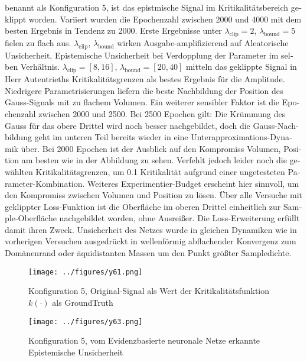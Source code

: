 \begin{otherlanguage}{ngerman}
benannt als Konfiguration 5, ist das epistmische Signal im Kritikalitätsbereich geklippt worden. Variiert wurden die Epochenzahl zwischen 2000 und 4000 mit dem besten Ergebnis in Tendenz zu 2000. Erste Ergebnisse unter $\lambda_{\text{clip}}=2$, $\lambda_{\text{bound}}=5$ fielen zu flach aus. $\lambda_{\text{clip}}$, $\lambda_{\text{bound}}$ wirken Ausgabe-amplifizierend auf \gls{Aleatorische Unsicherheit}, \gls{Epistemische Unsicherheit} bei Verdopplung der Parameter im selben Verhältnis. $\lambda_{\text{clip}}=[8, 16]$, $\lambda_{\text{bound}}=[20, 40]$ mitteln das geklippte Signal in Herr Autentrieths Kritikalitätsgrenzen als bestes Ergebnis für die Amplitude. Niedrigere Parametrisierungen liefern die beste Nachbildung der Position des Gauss-Signals mit zu flachem Volumen. Ein weiterer sensibler Faktor ist die Epochenzahl zwischen 2000 und 2500. Bei 2500 Epochen gilt: Die Krümmung des Gauss für das obere Drittel wird noch besser nachgebildet, doch die Gauss-Nachbildung geht im unteren Teil bereits wieder in eine Unterapproximations-Dynamik über. Bei 2000 Epochen ist der Ausblick auf den Kompromiss Volumen, Position am besten wie in der Abbildung zu sehen. Verfehlt jedoch leider noch die gewählten Kritikalitätsgrenzen, um 0.1 Kritikalität aufgrund einer ungetesteten Parameter-Kombination. Weiteres Experimentier-Budget erscheint hier sinnvoll, um den Kompromiss zwischen Volumen und Position zu lösen. Über alle Versuche mit geklippter Loss-Funktion ist die Oberfläche im oberen Drittel einheitlich zur Sample-Oberfläche nachgebildet worden, ohne Ausreißer. Die Loss-Erweiterung erfüllt damit ihren Zweck. Unsicherheit des Netzes wurde in gleichen Dynamiken wie in vorherigen Versuchen ausgedrückt in wellenförmig abflachender Konvergenz zum Domänenrand oder äquidistanten Massen um den Punkt größter Sampledichte.


\begin{figure}[!ht]
  \centering

  \begin{minipage}[t]{0.48\textwidth}
    \centering
    \texttt{[image: ../figures/y61.png]}
    \caption*{Konfiguration 5, Original-Signal als Wert der Kritikalitätsfunktion \(k(\cdot)\) als \gls{GroundTruth}}
    \label{fig:bild51}
  \end{minipage}%
  \hfill
  \begin{minipage}[t]{0.48\textwidth}
    \centering
    \texttt{[image: ../figures/y63.png]}
    \caption*{Konfiguration 5, vom \gls{Evidenzbasierte neuronale Netze} erkannte \gls{Epistemische Unsicherheit}}
    \label{fig:bild53}
  \end{minipage}


\end{figure}
\end{otherlanguage}
